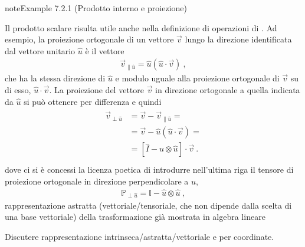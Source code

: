 \documentclass[letterpaper,10pt,italian]{jupyterBook}
\begin{document}
\label{ch/algebra/vector-algebra-euclidean-space-2d:ex:inner-product:proj}
\begin{sphinxadmonition}{note}{Example 7.2.1 (Prodotto interno e proiezione)}



\sphinxAtStartPar
Il prodotto scalare risulta utile anche nella definizione di operazioni di . Ad esempio, la proiezione ortogonale di un vettore \(\vec{v}\) lungo la direzione identificata dal vettore unitario \(\hat{u}\) è il vettore
\begin{equation*}
\begin{split}\vec{v}_{\parallel \hat{u}} = \hat{u} \left( \hat{u} \cdot \vec{v} \right) \ ,\end{split}
\end{equation*}
\sphinxAtStartPar
che ha la stessa direzione di \(\hat{u}\) e modulo uguale alla proiezione ortogonale di \(\vec{v}\) su di esso, \(\hat{u} \cdot \vec{v}\). La proiezione del vettore \(\vec{v}\) in direzione ortogonale a quella indicata da \(\hat{u}\) si può ottenere per differenza e quindi
\begin{equation*}
\begin{split}\begin{aligned}
  \vec{v}_{\perp \hat{u}} 
  & = \vec{v} - \vec{v}_{\parallel \hat{u}} = \\
  & = \vec{v} - \hat{u} \left( \hat{u} \cdot \vec{v} \right) = \\
  & = \left[ \hat{I} - \hat{u} \otimes \hat{u} \right] \cdot \vec{v} \ . \\
\end{aligned}\end{split}
\end{equation*}
\sphinxAtStartPar
dove ci si è concessi la licenza poetica di introdurre nell’ultima riga il tensore di proiezione ortogonale in direzione perpendicolare a \(\hat{u}\),
\begin{equation*}
\begin{split}\mathbb{P}_{\perp \hat{u}} = \mathbb{I} - \hat{u} \otimes \hat{u} \ ,\end{split}
\end{equation*}
\sphinxAtStartPar
rappresentazione astratta (vettoriale/tensoriale, che non dipende dalla scelta di una base vettoriale) della trasformazione già mostrata in algebra lineare  

\sphinxAtStartPar
{} Discutere rappresentazione intrinseca/astratta/vettoriale e per coordinate.
\end{sphinxadmonition}
\end{document}
